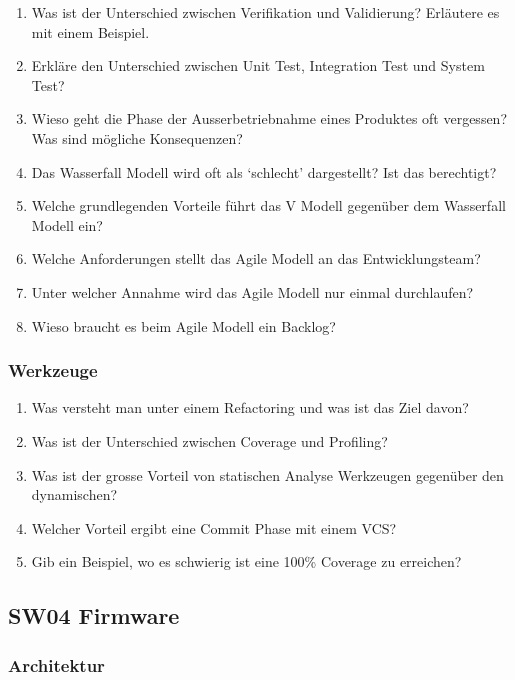 \documentclass[
  10pt,
  a4paper,
]{article}
\numberwithin{equation}{section}
\begin{document}
\begin{enumerate}
\def\labelenumi{\arabic{enumi}.}
\item
  Was ist der Unterschied zwischen Verifikation und Validierung?
  Erläutere es mit einem Beispiel.
\item
  Erkläre den Unterschied zwischen Unit Test, Integration Test und
  System Test?
\item
  Wieso geht die Phase der Ausserbetriebnahme eines Produktes oft
  vergessen? Was sind mögliche Konsequenzen?
\item
  Das Wasserfall Modell wird oft als `schlecht' dargestellt? Ist das
  berechtigt?
\item
  Welche grundlegenden Vorteile führt das V Modell gegenüber dem
  Wasserfall Modell ein?
\item
  Welche Anforderungen stellt das Agile Modell an das Entwicklungsteam?
\item
  Unter welcher Annahme wird das Agile Modell nur einmal durchlaufen?
\item
  Wieso braucht es beim Agile Modell ein Backlog?
\end{enumerate}

\hypertarget{werkzeuge}{%
\subsubsection{Werkzeuge}\label{werkzeuge}}

\begin{enumerate}
\def\labelenumi{\arabic{enumi}.}
\item
  Was versteht man unter einem Refactoring und was ist das Ziel davon?
\item
  Was ist der Unterschied zwischen Coverage und Profiling?
\item
  Was ist der grosse Vorteil von statischen Analyse Werkzeugen gegenüber
  den dynamischen?
\item
  Welcher Vorteil ergibt eine Commit Phase mit einem VCS?
\item
  Gib ein Beispiel, wo es schwierig ist eine 100\% Coverage zu
  erreichen?
\end{enumerate}

\hypertarget{sw04-firmware}{%
\subsection{SW04 Firmware}\label{sw04-firmware}}

\hypertarget{architektur-1}{%
\subsubsection{Architektur}\label{architektur-1}}
\end{document}
